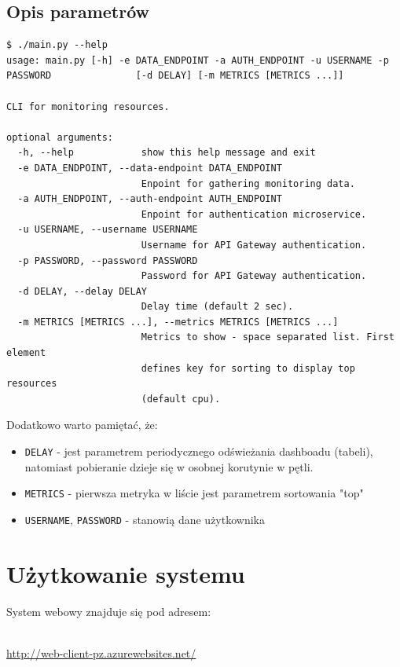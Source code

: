 \documentclass{article}
\begin{document}
\subsection{Opis parametrów}
\begin{lstlisting}
$ ./main.py --help
usage: main.py [-h] -e DATA_ENDPOINT -a AUTH_ENDPOINT -u USERNAME -p PASSWORD               [-d DELAY] [-m METRICS [METRICS ...]]

CLI for monitoring resources.

optional arguments:
  -h, --help            show this help message and exit
  -e DATA_ENDPOINT, --data-endpoint DATA_ENDPOINT
                        Enpoint for gathering monitoring data.
  -a AUTH_ENDPOINT, --auth-endpoint AUTH_ENDPOINT
                        Enpoint for authentication microservice.
  -u USERNAME, --username USERNAME
                        Username for API Gateway authentication.
  -p PASSWORD, --password PASSWORD
                        Password for API Gateway authentication.
  -d DELAY, --delay DELAY
                        Delay time (default 2 sec).
  -m METRICS [METRICS ...], --metrics METRICS [METRICS ...]
                        Metrics to show - space separated list. First element
                        defines key for sorting to display top resources
                        (default cpu).
\end{lstlisting}

Dodatkowo warto pamiętać, że:

\begin{itemize}
\item \texttt{DELAY} - jest parametrem periodycznego odświeżania dashboadu (tabeli), natomiast pobieranie dzieje się w osobnej korutynie w pętli.
\item \texttt{METRICS} - pierwsza metryka w liście jest parametrem sortowania "top"
\item \texttt{USERNAME}, \texttt{PASSWORD} - stanowią dane użytkownika
\end{itemize}

\section{Użytkowanie systemu}
System webowy znajduje się pod adresem:\\\\
\centerline{\url{http://web-client-pz.azurewebsites.net/}}\\
\end{document}
